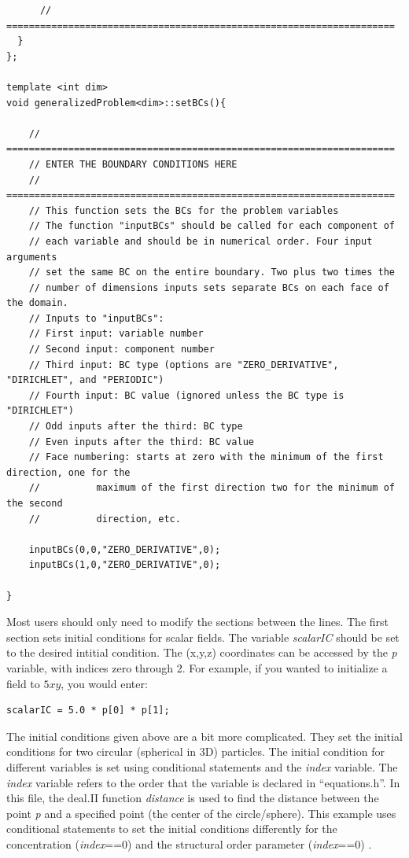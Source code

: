 \documentclass[10pt]{article} %
\begin{document}
\begin{lstlisting}
	  // =====================================================================
  }
};

template <int dim>
void generalizedProblem<dim>::setBCs(){

	// =====================================================================
	// ENTER THE BOUNDARY CONDITIONS HERE
	// =====================================================================
	// This function sets the BCs for the problem variables
	// The function "inputBCs" should be called for each component of
	// each variable and should be in numerical order. Four input arguments
	// set the same BC on the entire boundary. Two plus two times the
	// number of dimensions inputs sets separate BCs on each face of the domain.
	// Inputs to "inputBCs":
	// First input: variable number
	// Second input: component number
	// Third input: BC type (options are "ZERO_DERIVATIVE", "DIRICHLET", and "PERIODIC")
	// Fourth input: BC value (ignored unless the BC type is "DIRICHLET")
	// Odd inputs after the third: BC type
	// Even inputs after the third: BC value
	// Face numbering: starts at zero with the minimum of the first direction, one for the 
	//			maximum of the first direction two for the minimum of the second 
	//			direction, etc.

	inputBCs(0,0,"ZERO_DERIVATIVE",0);
	inputBCs(1,0,"ZERO_DERIVATIVE",0);

}
\end{lstlisting}
\normalsize

Most users should only need to modify the sections between the lines. The first section sets initial conditions for scalar fields. The variable \emph{scalarIC} should be set to the desired intitial condition. The (x,y,z) coordinates can be accessed by the \emph{p} variable, with indices zero through 2. For example, if you wanted to initialize a field to $5xy$, you would enter:
\tiny
\begin{lstlisting} 
scalarIC = 5.0 * p[0] * p[1];
\end{lstlisting} \normalsize
The initial conditions given above are a bit more complicated. They set the initial conditions for two circular (spherical in 3D) particles. The initial condition for different variables is set using conditional statements and the \emph{index} variable. The \emph{index} variable refers to the order that the variable is declared in ``equations.h''. In this file, the deal.II function \emph{distance} is used to find the distance between the point \emph{p} and a specified point (the center of the circle/sphere). This example uses conditional statements to set the initial conditions differently for the concentration (\emph{index}==0) and the structural order parameter  (\emph{index}==0) .
\end{document}
